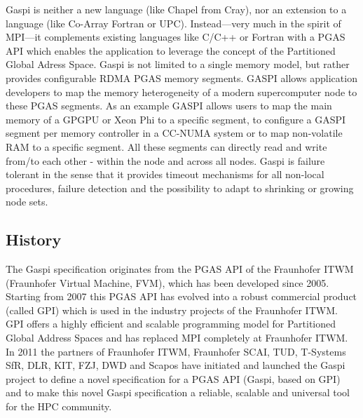\documentclass[a4paper]{article}
\newlength{\st}\setlength{\st}{0pt}
\newcommand{\GASPI}{{\sc Gaspi}}
\begin{document}
\GASPI{} is neither a new language (like Chapel from Cray), nor an extension to a
language (like Co-Array Fortran or UPC). Instead---very much in the
spirit of MPI---it complements existing languages like C/C++ or
Fortran with a PGAS API which enables the application to leverage the
concept of the Partitioned Global Adress Space. \GASPI{} is not limited to a
single memory model, but rather provides configurable RDMA
PGAS memory segments. GASPI allows application developers to map the memory heterogeneity of a modern supercomputer node to these PGAS segments. As an example GASPI allows users to map the main memory of a GPGPU or Xeon Phi to a specific segment, to configure a GASPI segment per memory controller in a CC-NUMA system or to map non-volatile RAM to a specific segment. All these segments can directly read and write from/to each other - within the node and across all nodes.
\GASPI{} is failure tolerant in the sense that it provides timeout mechanisms for all non-local procedures, failure
detection and the possibility to adapt to shrinking or growing node sets.

\subsection{History}
The \GASPI{} specification originates from the PGAS API of the Fraunhofer
ITWM (Fraunhofer Virtual Machine, FVM), which has been developed since
2005. Starting from 2007 this PGAS API has evolved into a robust
commercial product (called GPI) which is used in the industry projects
of the Fraunhofer ITWM. GPI offers a highly efficient and scalable
programming model for Partitioned Global Address Spaces and has
replaced MPI completely at Fraunhofer ITWM. In 2011 the partners of
Fraunhofer ITWM, Fraunhofer SCAI, TUD, T-Systems SfR, DLR, KIT, FZJ,
DWD and Scapos have initiated and launched the \GASPI{} project to
define a novel specification for a PGAS API (\GASPI{}, based on GPI) and to
make this novel \GASPI{} specification a reliable, scalable and universal
tool for the HPC community.

% 
% 
\end{document}

